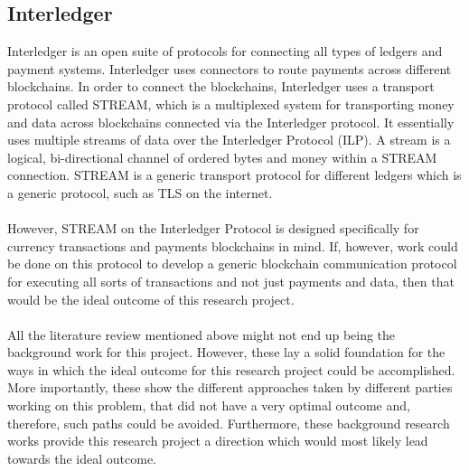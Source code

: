 \documentclass[a4paper,twoside,phd]{BYUPhys}
\begin{document}
\subsection{Interledger}
Interledger is an open suite of protocols for connecting all types of ledgers and payment systems. Interledger uses connectors to route payments across different blockchains. In order to connect the blockchains, Interledger uses a transport protocol called STREAM, which is a multiplexed system for transporting money and data across blockchains connected via the Interledger protocol. It essentially uses multiple streams of data over the Interledger Protocol (ILP). A stream is a logical, bi-directional channel of ordered bytes and money within a STREAM connection. STREAM is a generic transport protocol for different ledgers which is a generic protocol, such as TLS on the internet. \cite{2018InterledgerInterledger}\cite{2018STREAMInterledger}
\\
\\
However, STREAM on the Interledger Protocol is designed specifically for currency transactions and payments blockchains in mind. If, however, work could be done on this protocol to develop a generic blockchain communication protocol for executing all sorts of transactions and not just payments and data, then that would be the ideal outcome of this research project.
\\
\\
All the literature review mentioned above might not end up being the background work for this project. However, these lay a solid foundation for the ways in which the ideal outcome for this research project could be accomplished. More importantly, these show the different approaches taken by different parties working on this problem, that did not have a very optimal outcome and, therefore, such paths could be avoided. Furthermore, these background research works provide this research project a direction which would most likely lead towards the ideal outcome.
\end{document}
